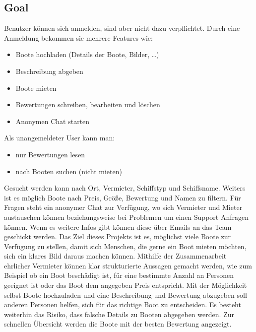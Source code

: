 \documentclass[12pt]{article}
\theoremstyle{definition}
\newenvironment{explanation}{%
   \setlength{\parindent}{0pt}
   \itshape
   \color{blue}
}{}
\begin{document}
\subsection{Goal}
\begin{explanation}
	Benutzer können sich anmelden, sind aber nicht dazu verpflichtet. Durch eine Anmeldung
	bekommen sie mehrere Features wie:
	\begin{itemize}
		\item Boote hochladen (Details der Boote, Bilder, …)
		\item Beschreibung abgeben
		\item Boote mieten
		\item Bewertungen schreiben, bearbeiten und löschen
		\item Anonymen Chat starten
	\end{itemize}
	Als unangemeldeter User kann man:
	\begin{itemize}
		\item nur Bewertungen lesen
		\item nach Booten suchen (nicht mieten)
	\end{itemize}
	Gesucht werden kann nach Ort, Vermieter, Schiffstyp und Schiffsname. Weiters ist es möglich Boote nach Preis, Größe, Bewertung und Namen zu filtern.
	Für Fragen steht ein anonymer Chat zur Verfügung, wo sich Vermieter und Mieter austauschen können beziehungsweise bei Problemen um einen Support Anfragen können. Wenn es weitere Infos gibt können diese über Emails an das Team geschickt werden.
	Das Ziel dieses Projekts ist es, möglichst viele Boote zur Verfügung zu stellen, damit sich Menschen, die gerne ein Boot mieten möchten, sich ein klares Bild daraus machen können. Mithilfe der Zusammenarbeit ehrlicher Vermieter können klar strukturierte Aussagen gemacht werden, wie zum Beispiel ob ein Boot beschädigt ist, für eine bestimmte Anzahl an Personen geeignet ist oder das Boot dem angegeben Preis entspricht. Mit der Möglichkeit selbst Boote hochzuladen und eine Beschreibung und Bewertung abzugeben soll anderen Personen helfen, sich für das richtige Boot zu entscheiden. Es besteht weiterhin das Risiko, dass falsche Details zu Booten abgegeben werden. Zur schnellen Übersicht werden die Boote mit der besten Bewertung angezeigt.
\end{explanation}
\pagebreak
\end{document}
